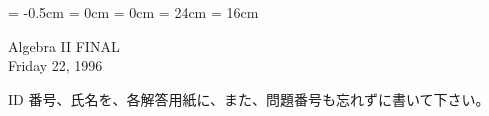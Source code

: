 

\topmargin = -0.5cm
\oddsidemargin = 0cm \evensidemargin = 0cm
\textheight = 24cm \textwidth = 16cm

\pagestyle{empty}

\newtheorem{thm}{定理}
\newcommand{\bZ}{\mbox{\boldmath $Z$}}
\newcommand{\bQ}{\mbox{\boldmath $Q$}}
\newcommand{\bR}{\mbox{\boldmath $R$}}
\newcommand{\bC}{\mbox{\boldmath $C$}}
\newcommand{\bigx}{{\large $\times$}}


\begin{center}
{\gt\LARGE Algebra II  FINAL}\\
{\gt Friday 22, 1996}
\end{center}

\noindent
ID 番号、氏名を、各解答用紙に、また、問題番号も忘れずに書いて下さい。

